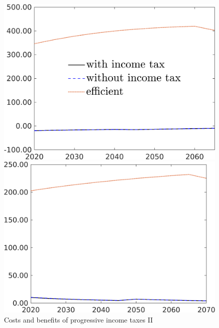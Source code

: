 \begin{figure}[h!!]
	\centering
	\caption{Costs and benefits of progressive income taxes II }\label{fig:optAll_percLf_dyn_app}
	\begin{minipage}[]{0.32\textwidth}
		\includegraphics[width=1\textwidth]{../../codding_model/own_basedOnFried/optimalPol_190722_tidiedUp/figures/all_10Aout22/gAagg_PercentageLFDynNT_Target_regime3_spillover0_noskill0_sep1_xgrowth0_PV1_etaa0.79_lgd1.png}
	\end{minipage}
	\begin{minipage}[]{0.32\textwidth}
		\includegraphics[width=1\textwidth]{../../codding_model/own_basedOnFried/optimalPol_190722_tidiedUp/figures/all_10Aout22/S_PercentageLfDynNT_Target_regime3_spillover0_noskill0_sep1_xgrowth0_PV1_etaa0.79_lgd0.png}

\end{minipage}
\end{figure}
